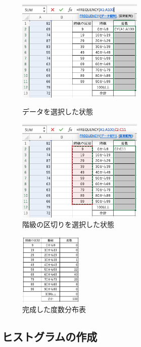 \begin{figure}[htbp]
    \begin{minipage}{0.5\hsize}
        \centering
        \includegraphics[width=6cm]{chap1/select_data_freq.png}
        \caption{データを選択した状態}
        \label{fig:select_data_freq}
    \end{minipage}
    \begin{minipage}{0.5\hsize}
        \centering
        \includegraphics[width=6cm]{chap1/select_classes_freq.png}
        \caption{階級の区切りを選択した状態}
        \label{fig:select_classes_freq}
    \end{minipage}
\end{figure}

\begin{figure}[htbp]
    \centering
    \includegraphics[width=3cm]{chap1/freq.png}
    \caption{完成した度数分布表}
    \label{fig:freq}
\end{figure}

\subsection{ヒストグラムの作成}

